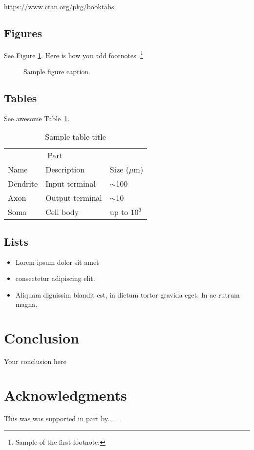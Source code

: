 \documentclass{article}
\begin{document}
\begin{center}
  \url{https://www.ctan.org/pkg/booktabs}
\end{center}


\subsection{Figures}
\lipsum[10] 
See Figure \ref{fig:fig1}. Here is how you add footnotes. \footnote{Sample of the first footnote.}
\lipsum[11] 

\begin{figure}
  \centering
  \fbox{\rule[-.5cm]{4cm}{4cm} \rule[-.5cm]{4cm}{0cm}}
  \caption{Sample figure caption.}
  \label{fig:fig1}
\end{figure}

\subsection{Tables}
\lipsum[12]
See awesome Table~\ref{tab:table}.

\begin{table}
 \caption{Sample table title}
  \centering
  \begin{tabular}{lll}
    \toprule
    \multicolumn{2}{c}{Part}                   \\
    \cmidrule(r){1-2}
    Name     & Description     & Size ($\mu$m) \\
    \midrule
    Dendrite & Input terminal  & $\sim$100     \\
    Axon     & Output terminal & $\sim$10      \\
    Soma     & Cell body       & up to $10^6$  \\
    \bottomrule
  \end{tabular}
  \label{tab:table}
\end{table}

\subsection{Lists}
\begin{itemize}
\item Lorem ipsum dolor sit amet
\item consectetur adipiscing elit. 
\item Aliquam dignissim blandit est, in dictum tortor gravida eget. In ac rutrum magna.
\end{itemize}


\section{Conclusion}
Your conclusion here

\section*{Acknowledgments}
This was was supported in part by......


  
  
\end{document}
